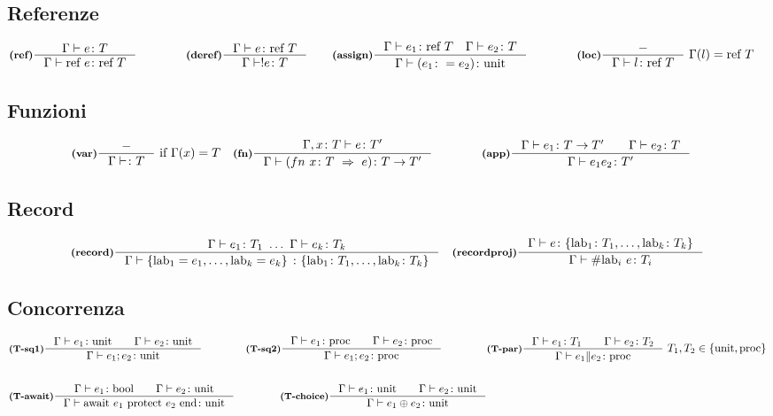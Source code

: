 \documentclass[a4paper, 10pt]{article}
\newcommand{\bool}{\textup{bool}}
\newcommand{\infer}[4]{\inference[\textbf{#1}]{#2}{#3}#4 }
\begin{document}
\subsection*{Referenze}
	\begin{align*}
		&\infer{(ref)}{\Gamma\vdash e \colon T}{\Gamma\vdash \text{ref } e\colon \text{ref } T}{}  \qquad  \qquad
		\infer{(deref)}{\Gamma\vdash e \colon\text{ref } T}{\Gamma\vdash !e \colon T}{} \qquad
		\infer{(assign)}{\Gamma\vdash e_1\colon \text{ref } T\quad \Gamma\vdash e_2\colon T }{\Gamma\vdash (e_1 \colon = e_2)\colon \text{unit}}{}\qquad  \qquad
		\infer{(loc)}{-}{\Gamma\vdash l\colon \text{ref } T}{\ \Gamma (l) = \text{ref } T}
	\end{align*}
\subsection*{Funzioni}
	\begin{align*}
		&\infer{(var)}{-}{\Gamma \vdash \colon T}{\ \textup{if}\ \Gamma (x) = T} 
		&\infer{(fn)}{\Gamma , x \colon T \vdash e\colon T'}{\Gamma\vdash (fn\ x\colon T\ \Rightarrow\ e )\colon T\rightarrow T'}{} \qquad\qquad
		&\infer{(app)}{\Gamma \vdash e_1 \colon T \rightarrow T'\qquad \Gamma\vdash e_2\colon T}{\Gamma\vdash e_1 e_2\colon T'}{} 
	\end{align*}
\subsection*{Record}
	\begin{align*}
		&\infer{(record)}{\Gamma \vdash e_1 \colon T_1\ \dots\ \Gamma \vdash e_k \colon T_k}{\Gamma \vdash \{\text{lab}_1 = e_1, \dots, \text{lab}_k = e_k \}\ \colon \{\text{lab}_1 \colon T_1,\dots, \text{lab}_k\colon T_k  \} }{}
		&\infer{(recordproj)}{\Gamma\vdash e\colon \{\text{lab}_1\colon T_1,\dots, \text{lab}_k\colon T_k \} }{\Gamma\vdash \# \text{lab}_i\ e \colon T_i}{}
	\end{align*}
\subsection*{Concorrenza}
	\begin{align*}
		&\infer{(T-sq1)}{\Gamma\vdash e_1\colon\textup{unit}\qquad \Gamma\vdash e_2\colon\textup{unit}}{\Gamma\vdash e_1;e_2\colon \textup{unit}}{}
		&\infer{(T-sq2)}{\Gamma\vdash e_1\colon\textup{proc}\qquad \Gamma\vdash e_2\colon\textup{proc}}{\Gamma\vdash e_1;e_2\colon \textup{proc}}{} \qquad\qquad
		&\infer{(T-par)}{\Gamma\vdash e_1\colon T_1\qquad \Gamma\vdash e_2\colon T_2}{\Gamma\vdash e_1 \| e_2\colon \textup{proc}}{\ T_1, T_2 \in \{\textup{unit}, \textup{proc}\}} \\ \\
		&\infer{(T-await)}{\Gamma\vdash e_1 \colon \bool\qquad \Gamma\vdash e_2\colon \textup{unit}}{
			\Gamma\vdash \textup{await}\ e_1\ \textup{protect}\ e_2\ \textup{end}\colon \textup{unit} }{} 
		&\infer{(T-choice)}{\Gamma\vdash e_1 \colon \textup{unit}\qquad \Gamma\vdash e_2\colon \textup{unit}}{\Gamma\vdash e_1 \oplus e_2\colon \textup{unit}}{}
	\end{align*}
\end{document}
